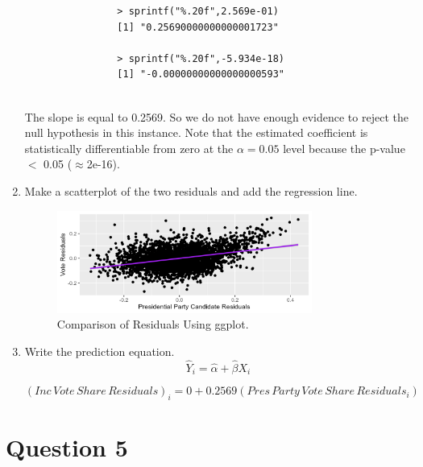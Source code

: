 \documentclass[12pt,letterpaper]{article}
\begin{document}
\begin{enumerate}
\begin{verbatim}
				> sprintf("%.20f",2.569e-01)
				[1] "0.25690000000000001723"
				
				> sprintf("%.20f",-5.934e-18)
				[1] "-0.00000000000000000593"
				
			\end{verbatim}
The slope is equal to 0.2569. So we do not have enough evidence to reject the null hypothesis in this instance. Note that the estimated coefficient is statistically differentiable from zero at the $\alpha=0.05$ level because the p-value  $<$ 0.05 ($\approx $2e-16).
	
		\item Make a scatterplot of the two residuals and add the regression line.
		
	  
			
	\begin{figure}[h!]
	\centering
	\caption{\footnotesize Comparison of Residuals Using ggplot.}
	\includegraphics[width=0.79\textwidth]{residuals_scatter.png}
	
\end{figure} 

\newpage	

		\item Write the prediction equation.
		{\large 			$$\hat{Y}_i = \hat{\alpha} +  \hat{\beta}X_i $$}
		
		{ 			$$(Inc \, Vote \, Share\, Residuals)_i =  {0} +  0.2569(Pres\,Party\,Vote\,Share\, Residuals_i) $$} 
		
	\end{enumerate}
	
	\newpage	

\section*{Question 5} 
\end{document}
